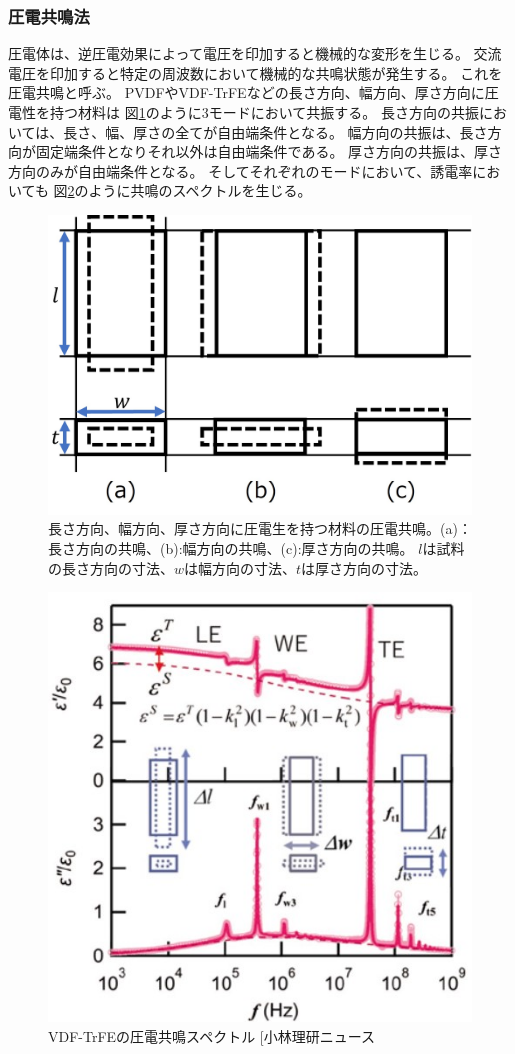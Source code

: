 \documentclass[dvipdfmx,12pt,a4paper]{jreport}
\makeatletter
\DeclareRobustCommand\cite{\unskip
    	\@ifnextchar[{\@tempswatrue\@citex}{\@tempswafalse\@citex[]}}
\makeatother
\begin{document}
			\subsubsection{圧電共鳴法}
			圧電体は、逆圧電効果によって電圧を印加すると機械的な変形を生じる。
			交流電圧を印加すると特定の周波数において機械的な共鳴状態が発生する。
			これを圧電共鳴と呼ぶ。
			PVDFやVDF-TrFEなどの長さ方向、幅方向、厚さ方向に圧電性を持つ材料は
			図\ref{圧電共鳴のモード}のように3モードにおいて共振する。
			長さ方向の共振においては、長さ、幅、厚さの全てが自由端条件となる。
			幅方向の共振は、長さ方向が固定端条件となりそれ以外は自由端条件である。
			厚さ方向の共振は、厚さ方向のみが自由端条件となる。
			そしてそれぞれのモードにおいて、誘電率においても
			図\ref{VDF-TrFEの圧電共鳴スペクトル}のように共鳴のスペクトルを生じる。
			\begin{figure}[h]
				\centering
				\includegraphics[width=0.5\linewidth]{圧電共鳴.jpg}
				\caption{長さ方向、幅方向、厚さ方向に圧電生を持つ材料の圧電共鳴。(a)：長さ方向の共鳴、(b):幅方向の共鳴、(c):厚さ方向の共鳴。
				$l$は試料の長さ方向の寸法、$w$は幅方向の寸法、$t$は厚さ方向の寸法。}
				\label{圧電共鳴のモード}
			\end{figure}
			\begin{figure}[h]
				\centering
				\includegraphics[width=0.5\linewidth]{VDF_TrFe_圧電共鳴.jpg}
				\caption{VDF-TrFEの圧電共鳴スペクトル\cite{小林理研ニュース}}
				\label{VDF-TrFEの圧電共鳴スペクトル}
			\end{figure}
\end{document}
